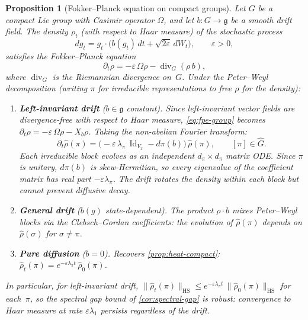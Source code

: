 \documentclass[12pt]{amsart}
\newtheorem{proposition}[theorem]{Proposition}
\theoremstyle{definition}
\theoremstyle{remark}
\begin{document}
\begin{proposition}[Fokker--Planck equation on compact groups]\label{prop:fpe-compact}
Let $G$ be a compact Lie group with Casimir operator $\Omega$, and let $b : G \to \mathfrak{g}$ be a smooth drift field. The density $\rho_t$ (with respect to Haar measure) of the stochastic process
\[
dg_t = g_t \cdot \bigl(b(g_t)\, dt + \sqrt{2\varepsilon}\, dW_t\bigr), \qquad \varepsilon > 0,
\]
satisfies the Fokker--Planck equation
\begin{equation}\label{eq:fpe-group}
\partial_t \rho = -\varepsilon\, \Omega\rho - \operatorname{div}_G(\rho\, b),
\end{equation}
where $\operatorname{div}_G$ is the Riemannian divergence on~$G$.
Under the Peter--Weyl decomposition (writing $\pi$ for irreducible
representations to free $\rho$ for the density):
\begin{enumerate}[label=(\roman*)]
\item \textbf{Left-invariant drift} ($b \in \mathfrak{g}$ constant). Since left-invariant vector fields are divergence-free with respect to Haar measure, \eqref{eq:fpe-group} becomes $\partial_t \rho = -\varepsilon\, \Omega\rho - X_b\rho$. Taking the non-abelian Fourier transform:
\[
\partial_t \widehat{\rho}(\pi) = \bigl(-\varepsilon\, \lambda_\pi\, \operatorname{Id}_{V_\pi} - d\pi(b)\bigr)\, \widehat{\rho}(\pi), \qquad [\pi] \in \widehat{G}.
\]
Each irreducible block evolves as an independent $d_\pi \times d_\pi$ matrix ODE. Since $\pi$ is unitary, $d\pi(b)$ is skew-Hermitian, so every eigenvalue of the coefficient matrix has real part $-\varepsilon\lambda_\pi$. The drift rotates the density within each block but cannot prevent diffusive decay.

\item \textbf{General drift} ($b(g)$ state-dependent). The product $\rho \cdot b$ mixes Peter--Weyl blocks via the Clebsch--Gordan coefficients: the evolution of $\widehat{\rho}(\pi)$ depends on $\widehat{\rho}(\sigma)$ for $\sigma \neq \pi$.

\item \textbf{Pure diffusion} ($b = 0$). Recovers \cref{prop:heat-compact}: $\widehat{\rho}_t(\pi) = e^{-\varepsilon\lambda_\pi t}\, \widehat{\rho}_0(\pi)$.
\end{enumerate}
In particular, for left-invariant drift, $\|\widehat{\rho}_t(\pi)\|_{\mathrm{HS}} \leq e^{-\varepsilon\lambda_\pi t}\, \|\widehat{\rho}_0(\pi)\|_{\mathrm{HS}}$ for each~$\pi$, so the spectral gap bound of \cref{cor:spectral-gap} is robust: convergence to Haar measure at rate $\varepsilon\lambda_1$ persists regardless of the drift.
\end{proposition}
\end{document}
